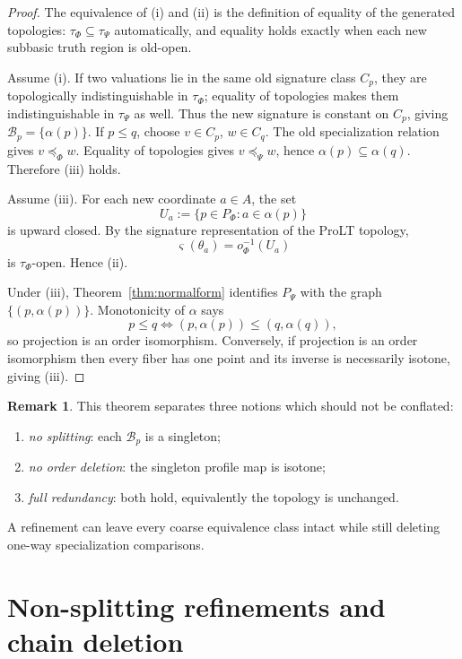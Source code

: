 \documentclass[11pt]{article}
\theoremstyle{definition}
\newtheorem{remark}[theorem]{Remark}
\newcommand{\truth}{\varsigma}
\begin{document}
\begin{proof}
The equivalence of (i) and (ii) is the definition of equality of the generated topologies: \(\tau_\Phi\subseteq\tau_\Psi\) automatically, and equality holds exactly when each new subbasic truth region is old-open.

Assume (i). If two valuations lie in the same old signature class \(C_p\), they are topologically indistinguishable in \(\tau_\Phi\); equality of topologies makes them indistinguishable in \(\tau_\Psi\) as well. Thus the new signature is constant on \(C_p\), giving \(\mathcal B_p=\{\alpha(p)\}\). If \(p\le q\), choose \(v\in C_p\), \(w\in C_q\). The old specialization relation gives \(v\preceq_\Phi w\). Equality of topologies gives \(v\preceq_\Psi w\), hence \(\alpha(p)\subseteq\alpha(q)\). Therefore (iii) holds.

Assume (iii). For each new coordinate \(a\in A\), the set
\[
U_a:=\{p\in P_\Phi:a\in\alpha(p)\}
\]
is upward closed. By the signature representation of the ProLT topology,
\[
\truth(\theta_a)=o_\Phi^{-1}(U_a)
\]
is \(\tau_\Phi\)-open. Hence (ii).

Under (iii), Theorem~\ref{thm:normalform} identifies \(P_\Psi\) with the graph \(\{(p,\alpha(p))\}\). Monotonicity of \(\alpha\) says
\[
p\le q\iff(p,\alpha(p))\le(q,\alpha(q)),
\]
so projection is an order isomorphism. Conversely, if projection is an order isomorphism then every fiber has one point and its inverse is necessarily isotone, giving (iii).
\end{proof}

\begin{remark}
This theorem separates three notions which should not be conflated:
\begin{enumerate}[label=(\alph*)]
\item \emph{no splitting}: each \(\mathcal B_p\) is a singleton;
\item \emph{no order deletion}: the singleton profile map is isotone;
\item \emph{full redundancy}: both hold, equivalently the topology is unchanged.
\end{enumerate}
A refinement can leave every coarse equivalence class intact while still deleting one-way specialization comparisons.
\end{remark}

\section{Non-splitting refinements and chain deletion}
\end{document}
